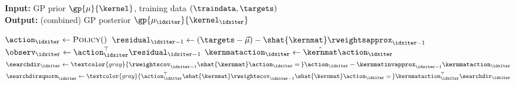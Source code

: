 \textbf{Input:} GP prior \(\gp{\mu}{\kernel}\), training data \((\traindata, \targets)\)\\%
\textbf{Output:} (combined) GP posterior \(\gp{\mu_{\idxiter}}{\kernel_{\idxiter}}\)
\begin{algorithmic}[1]
     
    \State \(\action_\idxiter \gets
    \textsc{Policy}()\) 
    \State \(\residual_{\idxiter - 1} \gets (\targets - \vec{\mu}) -  \shat{\kernmat} \rweightsapprox_{\idxiter-1}\)
    \State \(\observ_\idxiter \gets \action_\idxiter^\top \residual_{\idxiter-1}\)
    \State \(\kernmataction_\idxiter \gets \hat{\kernmat}\action_\idxiter\) 
    \State \(\searchdir_\idxiter \gets \textcolor{gray}{\rweightscov_{\idxiter-1} \shat{\kernmat}
    \action_\idxiter = \,} \action_\idxiter - \kernmatinvapprox_{\idxiter-1}\kernmataction_\idxiter\) 
    \State \(\searchdirsqnorm_\idxiter \gets \textcolor{gray}{\action_{\idxiter}^\top \shat{\kernmat} \rweightscov_{\idxiter-1} \shat{\kernmat} \action_{\idxiter} = \,}\kernmataction_\idxiter^\top \searchdir_\idxiter\) 

\end{algorithmic}
